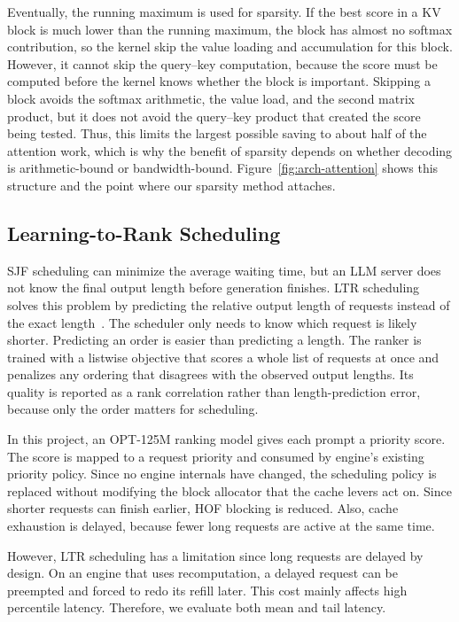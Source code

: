\documentclass[conference]{IEEEtran}
\begin{document}
Eventually, the running maximum is used for sparsity. If the best score in a KV block is much lower than the running maximum, the block has almost no softmax contribution, so the kernel skip the value loading and accumulation for this block. However, it cannot skip the query--key computation, because the score must be computed before the kernel knows whether the block is important. Skipping a block avoids the softmax arithmetic, the value load, and the second matrix product, but it does not avoid the query--key product that created the score being tested. Thus, this limits the largest possible saving to about half of the attention work, which is why the benefit of sparsity depends on whether decoding is arithmetic-bound or bandwidth-bound. Figure~\ref{fig:arch-attention} shows this structure and the point where our sparsity method attaches.

\subsection{Learning-to-Rank Scheduling}

SJF scheduling can minimize the average waiting time, but an LLM server does not know the final output length before generation finishes. LTR scheduling solves this problem by predicting the relative output length of requests instead of the exact length~\cite{fu2024ltr}. The scheduler only needs to know which request is likely shorter. Predicting an order is easier than predicting a length. The ranker is trained with a listwise objective that scores a whole list of requests at once and penalizes any ordering that disagrees with the observed output lengths. Its quality is reported as a rank correlation rather than length-prediction error, because only the order matters for scheduling.

In this project, an OPT-125M ranking model gives each prompt a priority score. The score is mapped to a request priority and consumed by engine's existing priority policy. Since no engine internals have changed, the scheduling policy is replaced without modifying the block allocator that the cache levers act on. Since shorter requests can finish earlier, HOF blocking is reduced. Also, cache exhaustion is delayed, because fewer long requests are active at the same time.

However, LTR scheduling has a limitation since long requests are delayed by design. On an engine that uses recomputation, a delayed request can be preempted and forced to redo its refill later. This cost mainly affects high percentile latency. Therefore, we evaluate both mean and tail latency.
\end{document}
